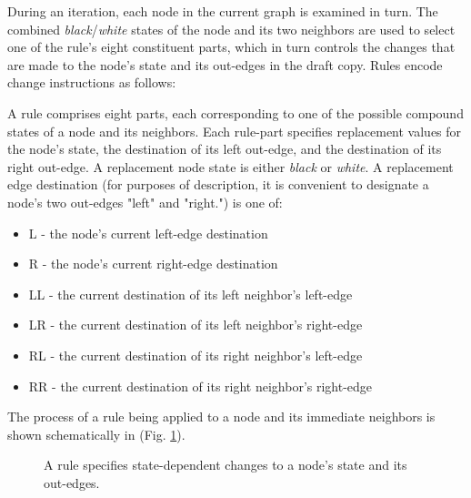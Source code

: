 \documentclass[twoside,twocolumn]{article}
\begin{document}
During an iteration, each node in the current graph is examined in turn.
The combined \textit{black}/\textit{white} states of the node and its two neighbors
are used to select one of the rule's eight constituent parts, which in turn
controls the changes that are made to the node's state and its out-edges in
the draft copy. Rules encode change instructions as follows:

A rule comprises eight parts, each corresponding to one of the possible compound states
of a node and its neighbors. Each rule-part specifies replacement values for
the node's state, the destination of its left out-edge, and the destination of its right
out-edge. A replacement node state is either \textit{black} or \textit{white}.
A replacement edge destination
(for purposes of description, it is convenient to designate a node's two out-edges "left" and "right.")
is one of:

\begin{itemize}
    \item L - the node's current left-edge destination
    \item R - the node's current right-edge destination
    \item LL - the current destination of its left neighbor's left-edge
    \item LR - the current destination of its left neighbor's right-edge
    \item RL - the current destination of its right neighbor's left-edge
    \item RR - the current destination of its right neighbor's right-edge
\end{itemize}
The process of a rule being applied to a node and its immediate neighbors is shown
schematically in (Fig. \ref{fig:Fig1}).

\begin{figure}[tb] 
    \centering
    \caption{A rule specifies state-dependent changes to a node's state and its out-edges.}
    \label{fig:Fig1}
\end{figure}
\end{document}
